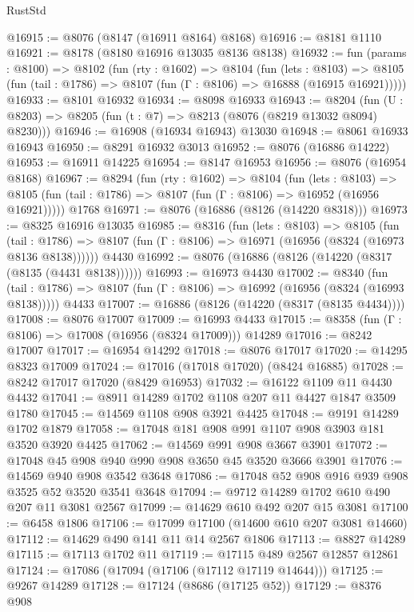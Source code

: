 \begin{lexlean}{RustStd}
\begin{coremodule}
@16915 := @8076 (@8147 (@16911 @8164) @8168)
@16916 := @8181 @1110
@16921 := @8178 (@8180 @16916 @13035 @8136 @8138)
@16932 := fun (params : @8100) =>
  @8102
    (fun (rty : @1602) =>
    @8104
      (fun (lets : @8103) =>
      @8105 (fun (tail : @1786) => @8107 (fun (Γ : @8106) => @16888 (@16915 @16921)))))
@16933 := @8101 @16932
@16934 := @8098 @16933
@16943 := @8204
    (fun (U : @8203) => @8205 (fun (t : @7) => @8213 (@8076 (@8219 @13032 @8094) @8230)))
@16946 := @16908 (@16934 @16943) @13030
@16948 := @8061 @16933 @16943
@16950 := @8291 @16932 @3013
@16952 := @8076 (@16886 @14222)
@16953 := @16911 @14225
@16954 := @8147 @16953
@16956 := @8076 (@16954 @8168)
@16967 := @8294
    (fun (rty : @1602) =>
    @8104
      (fun (lets : @8103) =>
      @8105 (fun (tail : @1786) => @8107 (fun (Γ : @8106) => @16952 (@16956 @16921)))))
    @1768
@16971 := @8076 (@16886 (@8126 (@14220 @8318)))
@16973 := @8325 @16916 @13035
@16985 := @8316
    (fun (lets : @8103) =>
    @8105
      (fun (tail : @1786) =>
      @8107 (fun (Γ : @8106) => @16971 (@16956 (@8324 (@16973 @8136 @8138))))))
    @4430
@16992 := @8076 (@16886 (@8126 (@14220 (@8317 (@8135 (@4431 @8138))))))
@16993 := @16973 @4430
@17002 := @8340
    (fun (tail : @1786) => @8107 (fun (Γ : @8106) => @16992 (@16956 (@8324 (@16993 @8138)))))
    @4433
@17007 := @16886 (@8126 (@14220 (@8317 (@8135 @4434))))
@17008 := @8076 @17007
@17009 := @16993 @4433
@17015 := @8358 (fun (Γ : @8106) => @17008 (@16956 (@8324 @17009))) @14289
@17016 := @8242 @17007
@17017 := @16954 @14292
@17018 := @8076 @17017
@17020 := @14295 @8323 @17009
@17024 := @17016 (@17018 @17020) (@8424 @16885)
@17028 := @8242 @17017 @17020 (@8429 @16953)
@17032 := @16122 @1109 @11 @4430 @4432
@17041 := @8911 @14289 @1702 @1108 @207 @11 @4427 @1847 @3509 @1780
@17045 := @14569 @1108 @908 @3921 @4425
@17048 := @9191 @14289 @1702 @1879
@17058 := @17048 @181 @908 @991 @1107 @908 @3903 @181 @3520 @3920 @4425
@17062 := @14569 @991 @908 @3667 @3901
@17072 := @17048 @45 @908 @940 @990 @908 @3650 @45 @3520 @3666 @3901
@17076 := @14569 @940 @908 @3542 @3648
@17086 := @17048 @52 @908 @916 @939 @908 @3525 @52 @3520 @3541 @3648
@17094 := @9712 @14289 @1702 @610 @490 @207 @11 @3081 @2567
@17099 := @14629 @610 @492 @207 @15 @3081
@17100 := @6458 @1806
@17106 := @17099 @17100 (@14600 @610 @207 @3081 @14660)
@17112 := @14629 @490 @141 @11 @14 @2567 @1806
@17113 := @8827 @14289
@17115 := @17113 @1702 @11
@17119 := @17115 @489 @2567 @12857 @12861
@17124 := @17086 (@17094 (@17106 (@17112 @17119 @14644)))
@17125 := @9267 @14289
@17128 := @17124 (@8686 (@17125 @52))
@17129 := @8376 @908

\end{coremodule}
\end{lexlean}
